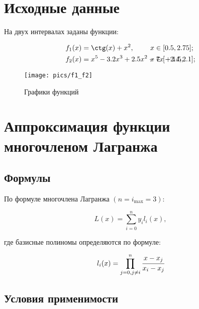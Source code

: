 \documentclass[a4paper, 14pt]{article}
\begin{document}



\setcounter{page}{2}


\section*{Исходные данные}

На двух интервалах заданы функции:

\begin{align}
    \label{f1}
    f_1(x) &= \ctg(x) + x^2, &\hspace{-2cm}  x &\in [0.5, 2.75]; \\
    \label{f2}
    f_2(x) &= x^5 - 3.2x^3 + 2.5x^2 - 7x + 1.5, &\hspace{-2cm} x &\in [-2.4, 2.1];
\end{align}

\begin{figure}[h] \centering
    \caption{Графики функций}
    \texttt{[image: pics/f1\_f2]}
    \label{pic:f1_f2}
\end{figure}

\clearpage

\section{Аппроксимация функции многочленом Лагранжа}

\subsection{Формулы}

По формуле многочлена Лагранжа $(n=i_{\max} = 3)$:

\begin{equation}
    L(x)=\sum_{i=0}^{n}y_il_i(x),
\end{equation}

где базисные полиномы определяются по формуле:

\begin{equation}
    \label{l_i}
    l_i(x)=\prod_{j=0,j\ne i}^{n}\cfrac{x-x_j}{x_i-x_j}
\end{equation}

\subsection{Условия применимости}
\end{document}
